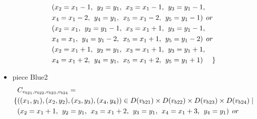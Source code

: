 \begin{appendices}
\begin{itemize}
\begin{align*}
&(x_{2} = x_{1}-1 ,\hspace{1ex}y_{2} = y_{1},\hspace{1ex}x_{3} = x_{1}-1,\hspace{1ex}y_{3} = y_{1}-1,
\\&x_{4} = x_{1}-2,\hspace{1ex}y_{4} = y_{1},\hspace{1ex}x_{5} = x_{1}-2,\hspace{1ex}y_{5} = y_{1}-1)\hspace{1ex} or \\
&(x_{2} = x_{1} ,\hspace{1ex}y_{2} = y_{1}-1,\hspace{1ex}x_{3} = x_{1}+1,\hspace{1ex}y_{3} = y_{1}-1,
\\&x_{4} = x_{1},\hspace{1ex}y_{4} = y_{1}-2,\hspace{1ex}x_{5} = x_{1}+1,\hspace{1ex}y_{5} = y_{1}-2)\hspace{1ex} or \\
&(x_{2} = x_{1}+1 ,\hspace{1ex}y_{2} = y_{1},\hspace{1ex}x_{3} = x_{1}+1,\hspace{1ex}y_{3} = y_{1}+1,
\\&x_{4} = x_{1}+2,\hspace{1ex}y_{4} = y_{1},\hspace{1ex}x_{5} = x_{1}+2,\hspace{1ex}y_{5} = y_{1}+1)\hspace{3ex}\}
\end{align*}  
  \item piece Blue2\\
  \begin{align*}
&\Const{b21}{b22}{b23}{b24}=\\
\{&((x_{1},y_{1}),(x_{2},y_{2}),(x_{3},y_{3}),(x_{4},y_{4}))\in \Domain{b21}\times \Domain{b22}\times\Domain{b23}\times\Domain{b24}\mid\\
&(x_{2} = x_{1} + 1,\hspace{1ex}y_{2} = y_{1},\hspace{1ex}x_{3} = x_{1} + 2, \hspace{1ex}y_{3} = y_{1},\hspace{1ex}x_{4} = x_{1}+3,\hspace{1ex}y_{4} = y_{1})\hspace{1ex} or\\

\end{align*}
\end{itemize}
\end{appendices}
